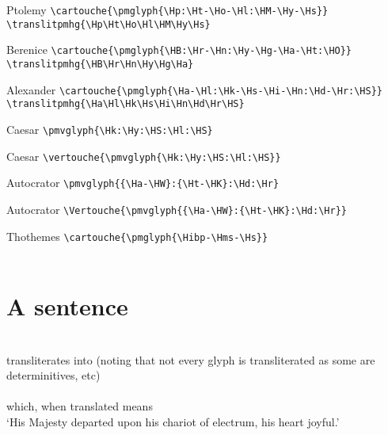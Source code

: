 \documentclass{article}
\begin{document}

Ptolemy \verb|\cartouche{\pmglyph{\Hp:\Ht-\Ho-\Hl:\HM-\Hy-\Hs}}| \\
\verb|\translitpmhg{\Hp\Ht\Ho\Hl\HM\Hy\Hs}| \\
\cartouche{\pmglyph{\Hp:\Ht-\Ho-\Hl:\HM-\Hy-\Hs}}
\translitpmhg{\Hp\Ht\Ho\Hl\HM\Hy\Hs}

Berenice \verb|\cartouche{\pmglyph{\HB:\Hr-\Hn:\Hy-\Hg-\Ha-\Ht:\HO}}| \\
\verb|\translitpmhg{\HB\Hr\Hn\Hy\Hg\Ha}| \\
\cartouche{\pmglyph{\HB:\Hr-\Hn:\Hy-\Hg-\Ha-\Ht:\HO}}
\translitpmhg{\HB\Hr\Hn\Hy\Hg\Ha}

Alexander \verb|\cartouche{\pmglyph{\Ha-\Hl:\Hk-\Hs-\Hi-\Hn:\Hd-\Hr:\HS}}| \\
\verb|\translitpmhg{\Ha\Hl\Hk\Hs\Hi\Hn\Hd\Hr\HS}| \\
\cartouche{\pmglyph{\Ha-\Hl:\Hk-\Hs-\Hi-\Hn:\Hd-\Hr:\HS}}
\translitpmhg{\Ha\Hl\Hk\Hs\Hi\Hn\Hd\Hr\HS}

Caesar \verb|\pmvglyph{\Hk:\Hy:\HS:\Hl:\HS}| \\
\pmvglyph{\Hk:\Hy:\HS:\Hl:\HS}

Caesar \verb|\vertouche{\pmvglyph{\Hk:\Hy:\HS:\Hl:\HS}}| \\
\vertouche{\pmvglyph{\Hk:\Hy:\HS:\Hl:\HS}}

Autocrator \verb|\pmvglyph{{\Ha-\HW}:{\Ht-\HK}:\Hd:\Hr}| \\
\pmvglyph{{\Ha-\HW}:{\Ht-\HK}:\Hd:\Hr}

Autocrator \verb|\Vertouche{\pmvglyph{{\Ha-\HW}:{\Ht-\HK}:\Hd:\Hr}}| \\
\Vertouche{\pmvglyph{{\Ha-\HW}:{\Ht-\HK}:\Hd:\Hr}}

Thothemes \verb|\cartouche{\pmglyph{\Hibp-\Hms-\Hs}}| \\
\cartouche{\pmglyph{\Hibp-\Hms-\Hs}} \\


\section{A sentence}


\pmglyph{\HU\Hw\HL\HJ\Hf-\Hq:\Hvbar-\HR:{\Hr:\Hr}-\Hy-\Ht:\HN-\Hf-\Hn:\Ht-\Hc\Hm\Hv-\HG:\Hvbar-\Hf\HZ\Hw\HV} \\
transliterates into (noting that not every glyph is transliterated as some are determinitives, etc)\\
 \\
which, when translated means \\
`His Majesty departed upon his chariot of electrum, his heart joyful.'
\end{document}
